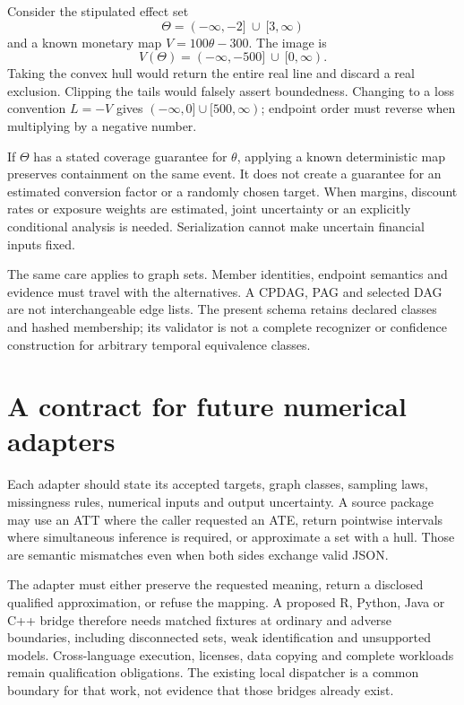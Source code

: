 Consider the stipulated effect set
\[
 \Theta=(-\infty,-2]\ \cup\ [3,\infty)
\]
and a known monetary map $V=100\theta-300$. The image is
\[
 V(\Theta)=(-\infty,-500]\ \cup\ [0,\infty).
\]
Taking the convex hull would return the entire real line and discard a real
exclusion. Clipping the tails would falsely assert boundedness. Changing to a
loss convention $L=-V$ gives $(-\infty,0]\cup[500,\infty)$; endpoint order must
reverse when multiplying by a negative number.

If $\Theta$ has a stated coverage guarantee for $\theta$, applying a known
deterministic map preserves containment on the same event. It does not create
a guarantee for an estimated conversion factor or a randomly chosen target.
When margins, discount rates or exposure weights are estimated, joint
uncertainty or an explicitly conditional analysis is needed. Serialization
cannot make uncertain financial inputs fixed.

The same care applies to graph sets. Member identities, endpoint semantics and
evidence must travel with the alternatives. A CPDAG, PAG and selected DAG are
not interchangeable edge lists. The present schema retains declared classes
and hashed membership; its validator is not a complete recognizer or confidence
construction for arbitrary temporal equivalence classes.

\section{A contract for future numerical adapters}

Each adapter should state its accepted targets, graph classes, sampling laws,
missingness rules, numerical inputs and output uncertainty. A source package
may use an ATT where the caller requested an ATE, return pointwise intervals
where simultaneous inference is required, or approximate a set with a hull.
Those are semantic mismatches even when both sides exchange valid JSON.

The adapter must either preserve the requested meaning, return a disclosed
qualified approximation, or refuse the mapping. A proposed R, Python, Java or
C++ bridge therefore needs matched fixtures at ordinary and adverse boundaries,
including disconnected sets, weak identification and unsupported models.
Cross-language execution, licenses, data copying and complete workloads remain
qualification obligations. The existing local dispatcher is a common boundary
for that work, not evidence that those bridges already exist.



